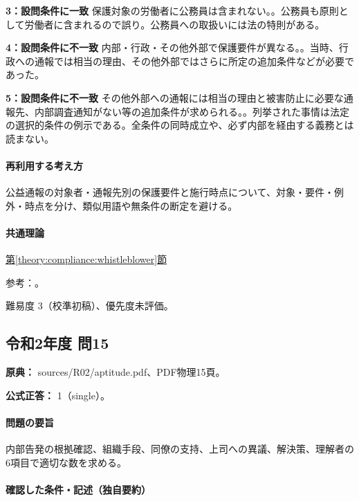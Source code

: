 \noindent\textbf{3：設問条件に一致} 保護対象の労働者に公務員は含まれない。。公務員も原則として労働者に含まれるので誤り。公務員への取扱いには法の特則がある。\par

\noindent\textbf{4：設問条件に不一致} 内部・行政・その他外部で保護要件が異なる。。当時、行政への通報では相当の理由、その他外部ではさらに所定の追加条件などが必要であった。\par

\noindent\textbf{5：設問条件に不一致} その他外部への通報には相当の理由と被害防止に必要な通報先、内部調査通知がない等の追加条件が求められる。。列挙された事情は法定の選択的条件の例示である。全条件の同時成立や、必ず内部を経由する義務とは読まない。\par

\paragraph{再利用する考え方} 公益通報の対象者・通報先別の保護要件と施行時点について、対象・要件・例外・時点を分け、類似用語や無条件の断定を避ける。

\paragraph{共通理論} \hyperref[theory:compliance:whistleblower]{第\ref*{theory:compliance:whistleblower}節}

\par 参考：\cite{caa_handbook_pre2022,caa_report_current,caa_amend2020,caa_schedule2026}。

\par 難易度 3（校準初稿）、優先度未評価。

\subsection{令和2年度 問15}
\label{q:r02-reg-apt-15}

\noindent\textbf{原典：} sources/R02/aptitude.pdf、PDF物理15頁。

\textbf{公式正答：} 1（single）。

\paragraph{問題の要旨} 内部告発の根拠確認、組織手段、同僚の支持、上司への異議、解決策、理解者の6項目で適切な数を求める。

\paragraph{確認した条件・記述（独自要約）}\mbox{}\par

